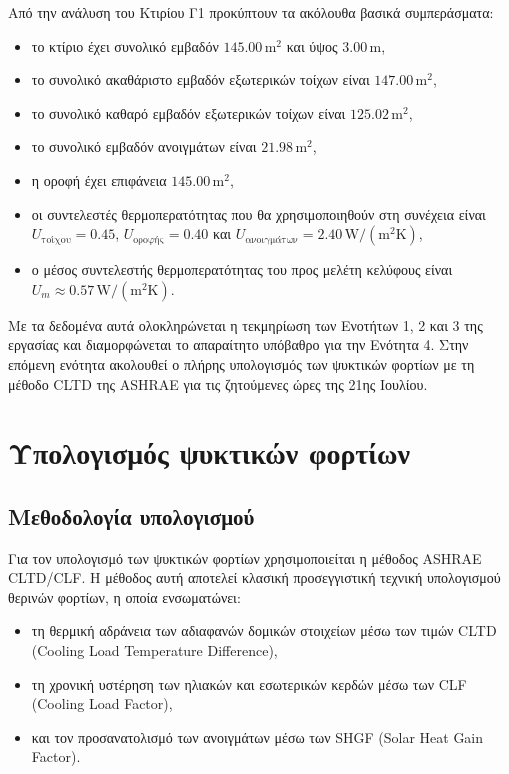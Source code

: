 \documentclass[12pt,a4paper]{article}
\begin{document}
Από την ανάλυση του Κτιρίου Γ1 προκύπτουν τα ακόλουθα βασικά συμπεράσματα:

\begin{itemize}
\item το κτίριο έχει συνολικό εμβαδόν \(145.00\,\mathrm{m^2}\) και ύψος \(3.00\,\mathrm{m}\),
\item το συνολικό ακαθάριστο εμβαδόν εξωτερικών τοίχων είναι \(147.00\,\mathrm{m^2}\),
\item το συνολικό καθαρό εμβαδόν εξωτερικών τοίχων είναι \(125.02\,\mathrm{m^2}\),
\item το συνολικό εμβαδόν ανοιγμάτων είναι \(21.98\,\mathrm{m^2}\),
\item η οροφή έχει επιφάνεια \(145.00\,\mathrm{m^2}\),
\item οι συντελεστές θερμοπερατότητας που θα χρησιμοποιηθούν στη συνέχεια είναι
\(U_{\text{τοίχου}} = 0.45\), \(U_{\text{οροφής}} = 0.40\) και
\(U_{\text{ανοιγμάτων}} = 2.40\,\mathrm{W/(m^2K)}\),
\item ο μέσος συντελεστής θερμοπερατότητας του προς μελέτη κελύφους είναι
\(U_m \approx 0.57\,\mathrm{W/(m^2K)}\).
\end{itemize}

Με τα δεδομένα αυτά ολοκληρώνεται η τεκμηρίωση των Ενοτήτων 1, 2 και 3 της
εργασίας και διαμορφώνεται το απαραίτητο υπόβαθρο για την Ενότητα 4. Στην
επόμενη ενότητα ακολουθεί ο πλήρης υπολογισμός των ψυκτικών φορτίων με τη μέθοδο
\textenglish{CLTD} της \textenglish{ASHRAE} για τις ζητούμενες ώρες της 21ης Ιουλίου.

\clearpage
\section{Υπολογισμός ψυκτικών φορτίων}

\subsection{Μεθοδολογία υπολογισμού}

Για τον υπολογισμό των ψυκτικών φορτίων χρησιμοποιείται η μέθοδος
\textenglish{ASHRAE CLTD/CLF}. Η μέθοδος αυτή αποτελεί κλασική προσεγγιστική τεχνική
υπολογισμού θερινών φορτίων, η οποία ενσωματώνει:

\begin{itemize}
\item τη θερμική αδράνεια των αδιαφανών δομικών στοιχείων μέσω των τιμών
\textenglish{CLTD} (\textenglish{Cooling Load Temperature Difference}),
\item τη χρονική υστέρηση των ηλιακών και εσωτερικών κερδών μέσω των
\textenglish{CLF} (\textenglish{Cooling Load Factor}),
\item και τον προσανατολισμό των ανοιγμάτων μέσω των
\textenglish{SHGF} (\textenglish{Solar Heat Gain Factor}).
\end{itemize}
\end{document}
